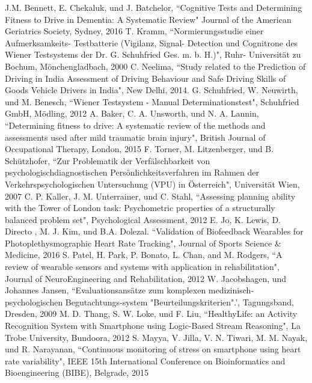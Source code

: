 \documentclass[conference]{IEEEtran}
\begin{document}
\begin{thebibliography}{00}
J.M. Bennett, E. Chekaluk, und J. Batchelor,
``Cognitive Tests and Determining Fitness to Drive in Dementia: A Systematic Review"
Journal of the American Geriatrics Society, Sydney, 2016
 T. Kramm, ``Normierungsstudie einer Aufmerksamkeits- Testbatterie (Vigilanz, Signal- Detection und Cognitrone des Wiener Testsystems der Dr. G. Schuhfried Ges. m. b. H.)", Ruhr- Universität zu Bochum, Mönchengladbach, 2000
 C. Neelima, ``Study related to the Prediction of Driving in India Assessment of Driving Behaviour and Safe Driving Skills of Goods Vehicle Drivers in India", New Delhi, 2014. 
 G. Schuhfried, W. Neuwirth, und M. Benesch, ``Wiener Testsystem - Manual Determinationstest", Schuhfried GmbH, Mödling, 2012
A. Baker, C. A. Unsworth, und N. A. Lannin,
``Determining fitness to drive: A systematic review of the methods and assessments used after mild traumatic brain injury", British Journal of Occupational Therapy, London, 2015
 F. Torner, M. Litzenberger, und B. Schützhofer, ``Zur Problematik der Verfälschbarkeit von psychologischdiagnostischen Persönlichkeitsverfahren im Rahmen der Verkehrspsychologischen Untersuchung (VPU) in Österreich", Universität Wien, 2007
 C. P. Kaller, J. M. Unterrainer, und C. Stahl, ``Assessing planning ability with the Tower of London task: Psychometric properties of a structurally balanced problem set", Psychological Assessment, 2012
 E. Jo, K. Lewis, D. Directo , M. J.  Kim, und B.A. Dolezal. ``Validation of Biofeedback Wearables for Photoplethysmographic Heart Rate Tracking", Journal of Sports Science \& Medicine, 2016
 S. Patel, H. Park, P. Bonato, L. Chan, and M. Rodgers, ``A review of wearable sensors and systems with application in rehabilitation", Journal of NeuroEngineering and Rehabilitation, 2012
 W. Jacobshagen, und Johannes Jansen, ``Evaluationsansätze zum komplexen medizinisch-psychologischen Begutachtungs-system "Beurteilungskriterien".', Tagungsband,  Dresden, 2009
 M. D. Thang, S. W. Loke, und F. Liu, ``HealthyLife: an Activity Recognition System with Smartphone using Logic-Based Stream Reasoning",  La Trobe University, Bundoora, 2012
 S. Mayya, V. Jilla, V. N. Tiwari, M. M. Nayak, und R. Narayanan, ``Continuous monitoring of stress on smartphone using heart rate variability", IEEE 15th International Conference on Bioinformatics and Bioengineering (BIBE), Belgrade, 2015

\end{thebibliography}
\end{document}
